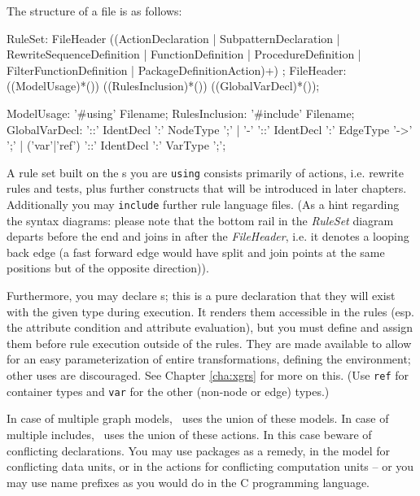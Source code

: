 The structure of a  file is as follows:
\begin{rail}
  RuleSet: FileHeader ((ActionDeclaration | SubpatternDeclaration | RewriteSequenceDefinition | FunctionDefinition | ProcedureDefinition | FilterFunctionDefinition | PackageDefinitionAction)+) ;
  FileHeader: ((ModelUsage)*()) ((RulesInclusion)*()) ((GlobalVarDecl)*());
\end{rail}
\pagebreak %
\begin{rail}
  ModelUsage: '\#using' Filename;
  RulesInclusion: '\#include' Filename;
  GlobalVarDecl: '::' IdentDecl ':' NodeType ';' | '-' '::' IdentDecl ':' EdgeType '->' ';' | ('var'|'ref') '::' IdentDecl ':' VarType ';';
\end{rail}

A rule set built on the s you are \texttt{using}
consists primarily of actions, i.e. rewrite rules and tests,
plus further constructs that will be introduced in later chapters.
Additionally you may \texttt{include} further rule language files.
(As a hint regarding the syntax diagrams: please note that the bottom rail in the \emph{RuleSet} diagram departs before the end and joins in after the \emph{FileHeader}, i.e. it denotes a looping back edge (a fast forward edge would have split and join points at the same positions but of the opposite direction)).

Furthermore, you may declare s; this is a pure declaration that they will exist with the given type during execution. It renders them accessible in the rules (esp. the attribute condition and attribute evaluation), but you must define and assign them before rule execution outside of the rules. They are made available to allow for an easy parameterization of entire transformations, defining the environment; other uses are discouraged. See Chapter \ref{cha:xgrs} for more on this.
(Use \texttt{ref} for container types and \texttt{var} for the other (non-node or edge) types.)

In case of multiple graph models, \GrG\ uses the union of these models. 
In case of multiple includes, \GrG\ uses the union of these actions. 
In this case beware of conflicting declarations.
You may use packages as a remedy, in the model for conflicting data units, or in the actions for conflicting computation units -- or you may use name prefixes as you would do in the C programming language.

